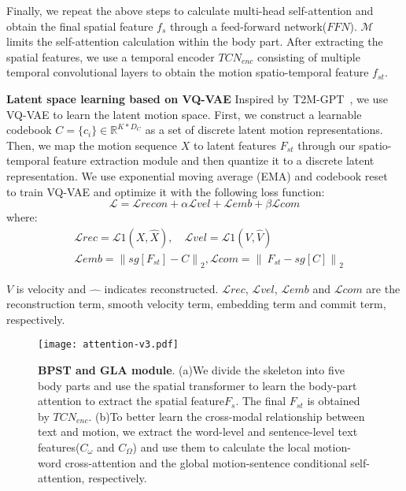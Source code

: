 \documentclass[10pt,twocolumn,letterpaper]{article}
\begin{document}
Finally, we repeat the above steps to calculate multi-head self-attention and obtain the final spatial feature $ {f_s}$ through a feed-forward network($FFN$). $\mathcal{M}$ limits the self-attention calculation within the body part. After extracting the spatial features, we use a temporal encoder $ {TCN_{enc}}$ consisting of multiple temporal convolutional layers to obtain the motion spatio-temporal feature $f_{st}$.


\textbf{Latent space learning based on VQ-VAE}\quad
Inspired by T2M-GPT~\cite{zhang2023t2m}, we use VQ-VAE to learn the latent motion space. First, we construct a learnable codebook $C = \{c_i\} \in \mathbb{R}^{K*D_C}$ as a set of discrete latent motion representations. Then, we map the motion sequence $X$ to latent features $F_{st}$ through our spatio-temporal feature extraction module and then quantize it to a discrete latent representation. We use exponential moving average (EMA) and codebook reset~\cite{williams2020hierarchical} to train VQ-VAE and optimize it with the following loss function:
\begin{equation}
\mathcal{L}= \mathcal{L}{recon}+\alpha \mathcal{L}{vel}+ \mathcal{L}{emb}+ \beta \mathcal{L}{com}
\label{equa:04}
\end{equation}
where:
\begin{equation}
\begin{aligned}
&\mathcal{L}{rec} =\mathcal{L}1(X,\hat{X}),\quad \mathcal{L}{vel} =\mathcal{L}1(V,\hat{V})\\
&\mathcal{L}{emb} =\left\lVert sg[F_{st}]-C \right \rVert_2, \mathcal{L}{com} =\left\lVert\ F_{st}-sg[C]\right\rVert_2
\end{aligned}
\label{equa:05}
\end{equation}

$V$ is velocity and $\hat{\quad }$ indicates reconstructed. $\mathcal{L}{rec}$, $\mathcal{L}{vel}$, $\mathcal{L}{emb}$ and $\mathcal{L}{com}$ are the reconstruction term, smooth velocity term, embedding term and commit term, respectively.

\begin{figure}[ht]
    \centering
    \texttt{[image: attention-v3.pdf]}
    \caption{\textbf{BPST and GLA module}. (a)We divide the skeleton into five body parts and use the spatial transformer to learn the body-part attention to extract the spatial feature$F_s$. The final $F_{st}$ is obtained by $TCN_{enc}$. (b)To better learn the cross-modal relationship between text and motion, we extract the word-level and sentence-level text features($C_\omega$ and $C_\Omega$) and use them to calculate the local motion-word cross-attention and the global motion-sentence conditional self-attention, respectively.}
    \label{img:03}
    \vspace{-10pt}
\end{figure}
\end{document}

